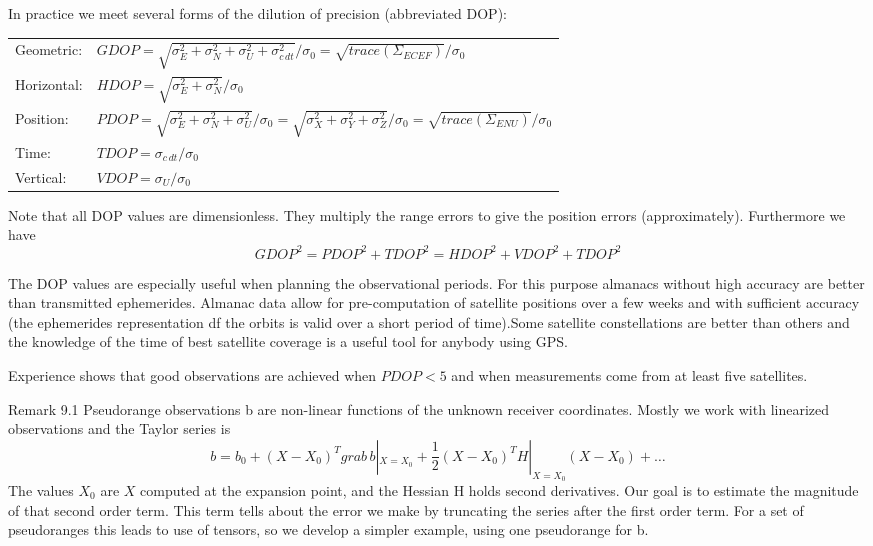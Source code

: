 		In practice we meet several forms of the dilution of precision (abbreviated DOP):
		\begin{table}
			\begin{tabularx}{\textwidth}{lX}
				Geometric: & $GDOP=\sqrt{\sigma^2_E+\sigma^2_N+\sigma^2_U+\sigma^2_{c\,dt}}/\sigma_0=\sqrt{trace(\Sigma_{ECEF})}/\sigma_0$ \\
				Horizontal:&$HDOP=\sqrt{\sigma^2_E+\sigma^2_N}/\sigma_0$ \\
				Position:  & $PDOP=\sqrt{\sigma^2_E+\sigma^2_N+\sigma^2_U}/\sigma_0=\sqrt{\sigma^2_X+\sigma^2_Y+\sigma^2_Z}/\sigma_0=\sqrt{trace(\Sigma_{ENU})}/\sigma_0 $ \\
				Time:	   &$TDOP=\sigma_{c\,dt}/\sigma_0$ \\
				Vertical:  &$VDOP=\sigma_U/\sigma_0$ 
			\end{tabularx}
		\end{table}
		
		Note that all DOP values are dimensionless. They multiply the range errors to give the position errors (approximately). Furthermore we have
		\[
			GDOP^2=PDOP^2+TDOP^2=HDOP^2+VDOP^2+TDOP^2
		\]
			
		The DOP values are especially useful when planning the observational periods. For this purpose almanacs without high accuracy are better than transmitted ephemerides. Almanac data allow for pre-computation of satellite positions over a few weeks and with sufficient accuracy (the ephemerides representation df the orbits is valid over a short period of time).Some satellite constellations are better than others and the knowledge of the time of best satellite coverage is a useful tool for anybody using GPS.
			
		Experience shows that good observations are achieved when $PDOP<5$ and when measurements come from at least five satellites.
			
		Remark 9.1 Pseudorange observations b are non-linear functions of the unknown receiver coordinates. Mostly we work with linearized observations and the Taylor series is
		\[
			b=b_0+(X-X_0)^Tgrab\,b|_{X=X_0}+\frac{1}{2}(X-X_0)^TH|_{X=X_0}(X-X_0)+\ldots
		\]	
		The values $X_0$ are $X$ computed at the expansion point, and the Hessian H holds second derivatives. Our goal is to estimate the magnitude of that second order term. This term tells about the error we make by truncating the series after the first order term. For a set of pseudoranges this leads to use of tensors, so we develop a simpler example, using one pseudorange for b.
			
